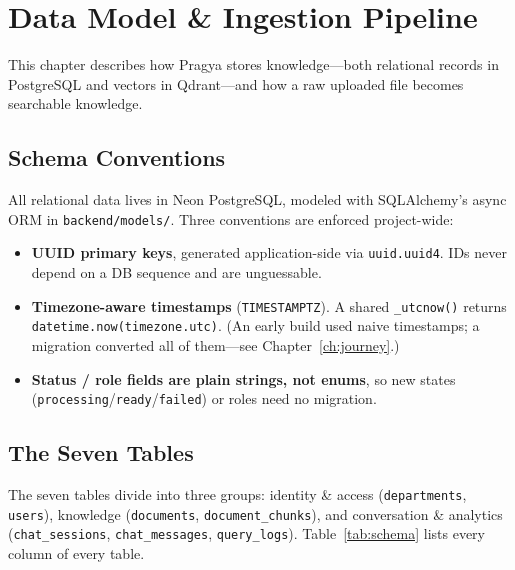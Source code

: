 \documentclass[11pt,a4paper,oneside]{report}
\newcommand{\code}[1]{\texttt{#1}}
\begin{document}
\chapter{Data Model \& Ingestion Pipeline}
\label{ch:data}

This chapter describes how Pragya stores knowledge---both relational records in PostgreSQL
and vectors in Qdrant---and how a raw uploaded file becomes searchable knowledge.

\section{Schema Conventions}
All relational data lives in Neon PostgreSQL, modeled with SQLAlchemy's async ORM in
\code{backend/models/}. Three conventions are enforced project-wide:

\begin{itemize}
  \item \textbf{UUID primary keys}, generated application-side via \code{uuid.uuid4}. IDs never
  depend on a DB sequence and are unguessable.
  \item \textbf{Timezone-aware timestamps} (\code{TIMESTAMPTZ}). A shared \code{\_utcnow()} returns
  \code{datetime.now(timezone.utc)}. (An early build used naive timestamps; a migration converted
  all of them---see Chapter~\ref{ch:journey}.)
  \item \textbf{Status / role fields are plain strings, not enums}, so new states
  (\code{processing}/\code{ready}/\code{failed}) or roles need no migration.
\end{itemize}

\section{The Seven Tables}
The seven tables divide into three groups: identity \& access (\code{departments},
\code{users}), knowledge (\code{documents}, \code{document\_chunks}), and conversation \&
analytics (\code{chat\_sessions}, \code{chat\_messages}, \code{query\_logs}).
Table~\ref{tab:schema} lists every column of every table.
\end{document}
